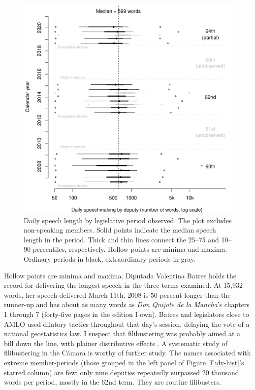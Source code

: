 \documentclass[letter,12pt]{article}
\begin{document}
\begin{figure}
  \centering
    \includegraphics[width=.5\columnwidth]{../plots/quantiles-periodo.pdf}
    \caption{Daily speech length by legislative period observed. The plot excludes non-speaking members. Solid points indicate the median speech length in the period. Thick and thin lines connect the 25--75 and 10--90 percentiles, respectively. Hollow points are minima and maxima. Ordinary periods in black, extraordinary periods in gray.}\label{F:quantiles}
\end{figure}

Hollow points are minima and maxima. Diputada Valentina Batres holds the record for delivering the longest speech in the three terms examined. At 15,932 words, her speech delivered March 11th, 2008 is 50 percent longer than the runner-up and has about as many words as \emph{Don Quijote de la Mancha}'s chapters 1 through 7 (forty-five pages in the edition I own). Batres and legislators close to AMLO used dilatory tactics throughout that day's session, delaying the vote of a national geostatistics law. I suspect that filibustering was probably aimed at a bill down the line, with plainer distributive effects \citep[cf.][]{wawro.schickler.filibuster.2007}. A systematic study of filibustering in the Cámara is worthy of further study. The names associated with extreme member-periods (those grouped in the left panel of Figure \ref{F:dv-hist}'s starred column) are few: only nine deputies repeatedly surpassed 20 thousand words per period, mostly in the 62nd term. They are routine filibusters.

\end{document}
